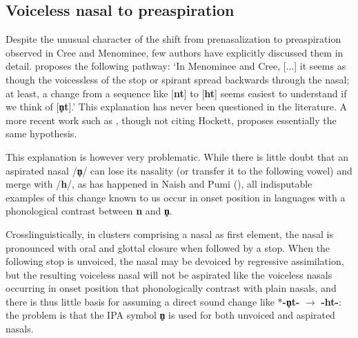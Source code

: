 \documentclass[oneside,a4paper,11pt]{article}
\newcommand{\ipa}[1]{{\phon\mbox{\textbf{#1}}}}
\newcommand{\phonet}[1]{[{\phon\mbox{\textbf{#1}}}]}
\begin{document}
\subsection{Voiceless nasal to preaspiration}
Despite the unusual character of the shift from prenasalization to preaspiration observed in Cree and Menominee, few authors have explicitly discussed them in detail.  \citet[60]{hockett81menominee} proposes the following pathway: `In Menominee and Cree, [...] it seems as though the voicessless of the stop or spirant spread backwards through the nasal; at least, a change from a sequence like \phonet{nt} to \phonet{ht} seems easiest to understand if we think of \phonet{n̥t}.' This explanation has never been questioned in the literature. A more recent work such as \citet[25-6]{clayton10preaspirated}, though not citing Hockett, proposes essentially the same hypothesis.

This explanation is however very problematic. While there is little doubt that an aspirated nasal /\ipa{n̥}/ can lose its nasality (or transfer it to the following vowel) and merge with /\ipa{h}/, as has happened in Naish and Pumi (\citealt{michaud-jacques12nasalite}), all indisputable examples of this change known to us occur in onset position in languages with a phonological contrast between \ipa{n} and \ipa{n̥}.

Crosslinguistically, in clusters comprising a nasal as first element, the nasal is pronounced with oral and glottal closure when followed by a stop. When the following stop is unvoiced, the nasal may be devoiced by regressive assimilation, but the resulting voiceless nasal will not be aspirated like the voiceless nasals occurring in onset position that phonologically contrast with plain nasals, and there is thus little basis for assuming a direct sound change like *\ipa{-n̥t-} $\rightarrow$ \ipa{-ht-}: the problem is that the IPA symbol \ipa{n̥} is used for both unvoiced and aspirated nasals.

\end{document}
